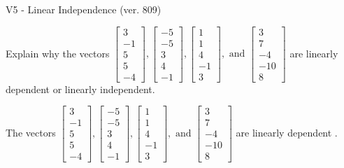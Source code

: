 \begin{exercise}
  \begin{exerciseTitle}V5 - Linear Independence (ver. 809)\end{exerciseTitle}
  \begin{exerciseStatement}
    Explain why the vectors \(\left[\begin{array}{r}
3 \\
-1 \\
5 \\
5 \\
-4
\end{array}\right] , \left[\begin{array}{r}
-5 \\
-5 \\
3 \\
4 \\
-1
\end{array}\right] , \left[\begin{array}{r}
1 \\
1 \\
4 \\
-1 \\
3
\end{array}\right] , \text{ and } \left[\begin{array}{r}
3 \\
7 \\
-4 \\
-10 \\
8
\end{array}\right]\) are linearly dependent or linearly independent.	


  \end{exerciseStatement}
  \begin{exerciseAnswer}
   The vectors \(\left[\begin{array}{r}
3 \\
-1 \\
5 \\
5 \\
-4
\end{array}\right] , \left[\begin{array}{r}
-5 \\
-5 \\
3 \\
4 \\
-1
\end{array}\right] , \left[\begin{array}{r}
1 \\
1 \\
4 \\
-1 \\
3
\end{array}\right] , \text{ and } \left[\begin{array}{r}
3 \\
7 \\
-4 \\
-10 \\
8
\end{array}\right]\) are 
  	 linearly dependent  .
  


  \end{exerciseAnswer}
\end{exercise}